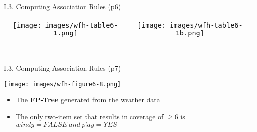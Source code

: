 \documentclass[handout]{beamer}
\newcommand{\strong}[1]{\textbf{\color{teal} #1}}
\begin{document}
\begin{frame}{I.3. Computing Association Rules (p6)}
\begin{center}
\begin{tabular}{cc}
\texttt{[image: images/wfh-table6-1.png]} &
\texttt{[image: images/wfh-table6-1b.png]} \\
\end{tabular}\\
\cite[Table 6.1]{WFH3:2011}
\end{center}
\end{frame}
\begin{frame}{I.3. Computing Association Rules (p7)}
\begin{center}
\texttt{[image: images/wfh-figure6-8.png]} \\
\cite[Figure 6.8]{WFH3:2011}
\end{center}
\begin{itemize}
\item The \strong{FP-Tree} generated from the weather data
\item The only two-item set that results in coverage of $\ge 6$ is
$windy=FALSE ~ and ~ play=YES$
\end{itemize}
\end{frame}







\end{document}
